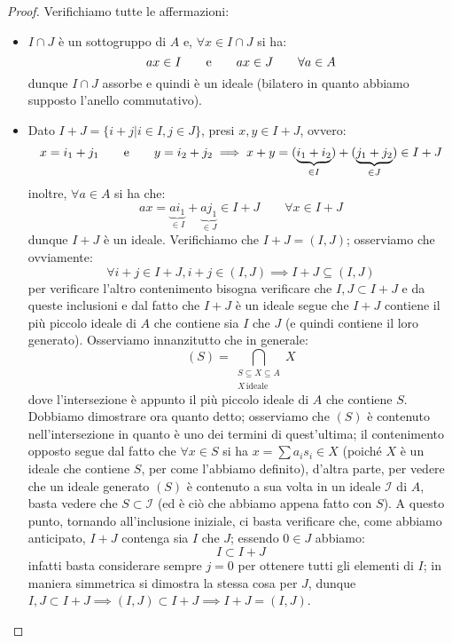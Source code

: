 \documentclass[11pt]{scrartcl}
\begin{document}
\begin{proof}
    Verifichiamo tutte le affermazioni:
    \begin{itemize}
        \item $I \cap J$ è un sottogruppo di $A$ e, $\forall x \in I \cap J$ si ha:
            \[ ax \in I \qquad \text e \qquad ax \in J \qquad \forall a \in A
                \]
            dunque $I \cap J$ assorbe e quindi è un ideale (bilatero in quanto abbiamo supposto l'anello commutativo).
        \item Dato $I + J = \{i + j | i \in I, j \in J\}$, presi $x,y \in I + J$, ovvero:
            \[ x = i_1 + j_1 \qquad \text e \qquad y = i_2 + j_2 \implies x + y = (\underbrace{i_1 + i_2}_{\in I}) + (\underbrace{j_1 + j_2}_{\in J}) \in I + J
                \]
            inoltre, $\forall a \in A$ si ha che:
            \[ ax = \underbrace{ai_1}_{\in I} + \underbrace{aj_1}_{\in J} \in I + J \qquad \forall x \in I + J
                \]
            dunque $I+J$ è un ideale. Verifichiamo che $I+J = (I,J)$; osserviamo che ovviamente:
            \[ \forall i+j \in I+J, i+j \in (I,J) \implies I + J \subseteq (I,J)
                \]
            per verificare l'altro contenimento bisogna verificare che $I,J \subset I + J$ e da queste inclusioni e dal fatto che $I + J$ è un ideale segue che
            $I + J$ contiene il più piccolo ideale di $A$ che contiene sia $I$ che $J$ (e quindi contiene il loro generato). Osserviamo innanzitutto che in generale:
                \[ (S) = \bigcap_{\substack{S \subseteq X \subseteq A\\ X\,\text{ideale}}} X
                    \]
            dove l'intersezione è appunto il più piccolo ideale di $A$ che contiene $S$.
            Dobbiamo dimostrare ora quanto detto; osserviamo che $(S)$ è contenuto nell'intersezione in quanto
            è uno dei termini di quest'ultima; il contenimento opposto segue dal fatto che $\forall x \in S$ si ha $x = \sum a_is_i \in X$ (poiché $X$ è un ideale che contiene $S$, per come l'abbiamo definito),
            d'altra parte, per vedere che un ideale generato $(S)$ è contenuto a sua volta in un ideale $\mathcal{I}$ di $A$, basta vedere che $S \subset \mathcal{I}$ (ed è ciò che abbiamo appena fatto con $S$).
            A questo punto, tornando all'inclusione iniziale, ci basta verificare che, come abbiamo anticipato, $I+J$ contenga sia $I$ che $J$; essendo $0 \in J$ abbiamo:
                \[ I \subset I + J
                    \]
            infatti basta considerare sempre $j = 0$ per ottenere tutti gli elementi di $I$; in maniera simmetrica si dimostra la stessa cosa per $J$, dunque $I,J \subset I + J \implies (I,J) \subset I + J \implies I + J = (I,J)$.

\end{itemize}
\end{proof}
\end{document}
